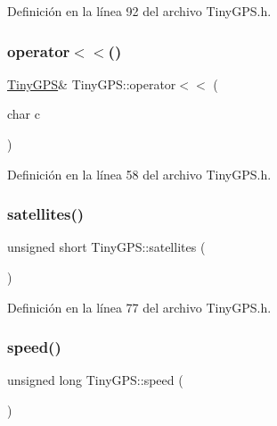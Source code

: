 Definición en la línea 92 del archivo Tiny\+G\+P\+S.\+h.

\mbox{\label{class_tiny_g_p_s_a63c3ffc6a8dd02050ec1c57ac11cfbb6}} 
\subsubsection{\texorpdfstring{operator$<$$<$()}{operator<<()}}
{\footnotesize\ttfamily \hyperlink{class_tiny_g_p_s}{Tiny\+G\+PS}\& Tiny\+G\+P\+S\+::operator$<$$<$ (\begin{DoxyParamCaption}\item[{char}]{c }\end{DoxyParamCaption})\hspace{0.3cm}{\ttfamily [inline]}}



Definición en la línea 58 del archivo Tiny\+G\+P\+S.\+h.

\mbox{\label{class_tiny_g_p_s_ae7664d48de81f316ebf40d7c8d37d1b6}} 
\subsubsection{\texorpdfstring{satellites()}{satellites()}}
{\footnotesize\ttfamily unsigned short Tiny\+G\+P\+S\+::satellites (\begin{DoxyParamCaption}{ }\end{DoxyParamCaption})\hspace{0.3cm}{\ttfamily [inline]}}



Definición en la línea 77 del archivo Tiny\+G\+P\+S.\+h.

\mbox{\label{class_tiny_g_p_s_aa1963e08aecceefe643b8aa31a29c0bc}} 
\subsubsection{\texorpdfstring{speed()}{speed()}}
{\footnotesize\ttfamily unsigned long Tiny\+G\+P\+S\+::speed (\begin{DoxyParamCaption}{ }\end{DoxyParamCaption})\hspace{0.3cm}{\ttfamily [inline]}}




